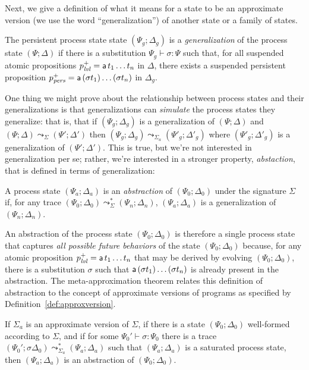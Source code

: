 Next, we give a definition of what it means for a state to be an 
approximate version (we use the word ``generalization'') of another state
or a family of states. 

\bigskip
\begin{definition}
  The persistent process state state $(\Psi_g; \Delta_g)$ is a {\em
    generalization} of the process state $(\Psi; \Delta)$ if there is
  a substitution $\Psi_g \vdash \sigma : \Psi$ such that, for all
  suspended atomic propositions $p^+_{\it lvl} = {\sf a}\,t_1\ldots t_n$
  in $\Delta$, there exists a suspended persistent proposition
  $p^+_{\it pers} = {\sf a}\,(\sigma t_1)\ldots(\sigma t_n)$ in
  $\Delta_g$.
\end{definition}
\bigskip

One thing we might prove about the relationship between process states
and their generalizations is that generalizations can {\it simulate}
the process states they generalize: that is, that if $(\Psi_g;
\Delta_g)$ is a generalization of $(\Psi; \Delta)$ and $(\Psi; \Delta)
\leadsto_\Sigma (\Psi'; \Delta')$ then $(\Psi_g; \Delta_g)
\leadsto_{\Sigma_a} (\Psi'_g; \Delta'_g)$ where $(\Psi'_g; \Delta'_g)$
is a generalization of $(\Psi'; \Delta')$. This is true, but we're not
interested in generalization per se; rather, we're interested in a
stronger property, {\em abstaction}, that is defined in terms of
generalization:

\bigskip
\begin{definition}
A process state $(\Psi_a; \Delta_a)$ is an {\em abstraction} of 
$(\Psi_0; \Delta_0)$ under the signature $\Sigma$ if, for any trace
$(\Psi_0; \Delta_0) \leadsto^*_\Sigma (\Psi_n; \Delta_n)$, 
$(\Psi_a; \Delta_a)$ is a generalization of $(\Psi_n; \Delta_n)$. 
\end{definition}
\bigskip

An abstraction of the process state $(\Psi_0; \Delta_0)$ is therefore
a single process state that captures {\it all possible future
  behaviors} of the state $(\Psi_0; \Delta_0)$ because, for any atomic
proposition $p^+_{\it lvl} = {\sf a}\,t_1\ldots t_n$ that may be derived
by evolving $(\Psi_0; \Delta_0)$, there is a substitution $\sigma$
such that ${\sf a}\,(\sigma t_1)\ldots(\sigma t_n)$ is already present
in the abstraction. The meta-approximation theorem relates this definition
of abstraction to the concept of approximate versions of programs as
specified by Definition~\ref{def:approxversion}.  

\bigskip
\begin{theorem}\label{thm:metapprox}
  If $\Sigma_a$ is an approximate version of $\Sigma$, if there is a
  state $(\Psi_0; \Delta_0)$ well-formed according to $\Sigma$, and if
  for some $\Psi_0' \vdash \sigma : \Psi_0$ there is a trace
  $(\Psi_0'; \sigma\Delta_0) \leadsto^*_{\Sigma_a} (\Psi_a; \Delta_a)$
  such that $(\Psi_a; \Delta_a)$ is a saturated process state, then
  $(\Psi_a; \Delta_a)$ is an abstraction of $(\Psi_0; \Delta_0)$.
\end{theorem}

